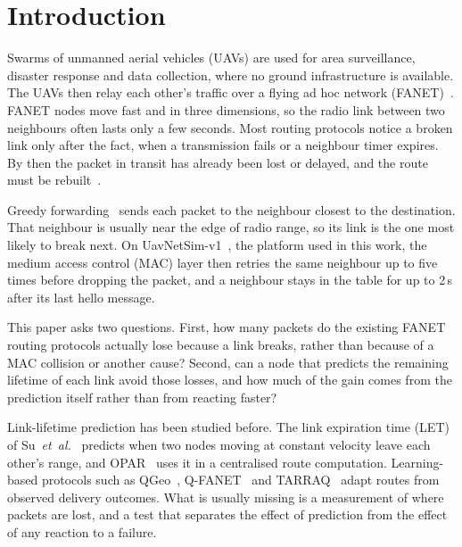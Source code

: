 \section{Introduction}
\label{sec:intro}

Swarms of unmanned aerial vehicles (UAVs) are used for area surveillance, disaster response and data
collection, where no ground infrastructure is available. The UAVs then relay each other's traffic over a
flying ad hoc network (FANET)~\cite{bekmezci2013fanet}. FANET nodes move fast and in three dimensions, so
the radio link between two neighbours often lasts only a few seconds. Most routing protocols notice a
broken link only after the fact, when a transmission fails or a neighbour timer expires. By then the packet
in transit has already been lost or delayed, and the route must be rebuilt~\cite{khan2020survey}.

Greedy forwarding~\cite{karp2000gpsr} sends each packet to the neighbour closest to the destination. That
neighbour is usually near the edge of radio range, so its link is the one most likely to break next. On UavNetSim-v1~\cite{zhou2025uavnetsim,zhou2026repo}, the
platform used in this work, the medium access control (MAC) layer then retries the same neighbour up to
five times before dropping the packet, and a neighbour stays in the table for up to 2\,s after its
last hello message.

This paper asks two questions. First, how many packets do the existing FANET routing protocols actually
lose because a link breaks, rather than because of a MAC collision or another cause? Second, can a node
that predicts the remaining lifetime of each link avoid those losses, and how much of the gain comes from
the prediction itself rather than from reacting faster?

Link-lifetime prediction has been studied before. The link expiration time (LET) of Su~\emph{et~al.}~\cite{su2001mobility}
predicts when two nodes moving at constant velocity leave each other's range, and OPAR~\cite{gharib2021opar}
uses it in a centralised route computation. Learning-based protocols such as QGeo~\cite{jung2017qgeo},
Q-FANET~\cite{dacosta2021qfanet} and TARRAQ~\cite{cui2022tarraq} adapt routes from observed delivery outcomes.
What is usually missing is a measurement of where packets are lost, and a test that separates the effect of
prediction from the effect of any reaction to a failure.

